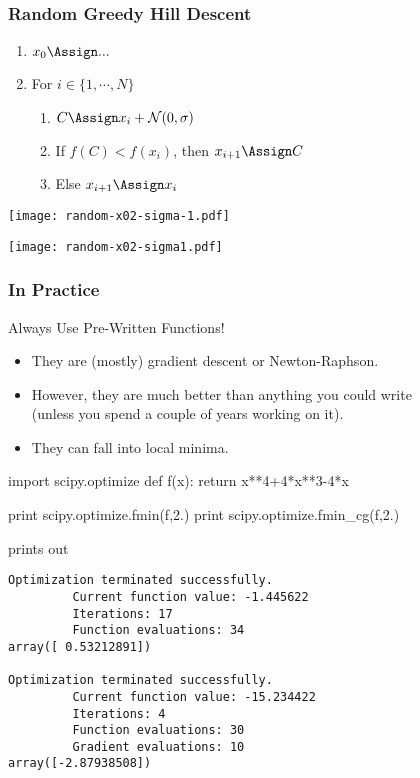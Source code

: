 \begin{frame}[fragile]
\frametitle{Random Greedy Hill Descent}
\begin{enumerate}
\item $x_0 \Assign ...$
\item For $i \in \{ 1, \cdots , N \}$
\begin{enumerate}
\item $C \Assign x_i + \mathcal{N}(0,\sigma)$
\item If $f(C) < f(x_i)$, then $x_{i+1} \Assign C$
\item Else $x_{i+1} \Assign x_i$
\end{enumerate}
\end{enumerate}
\end{frame}

\begin{frame}[fragile]

\centering
\texttt{[image: random-x02-sigma-1.pdf]}

\end{frame}


\begin{frame}[fragile]

\centering
\texttt{[image: random-x02-sigma1.pdf]}

\end{frame}

\begin{frame}[fragile]
\frametitle{In Practice}

\begin{block}{Always Use Pre-Written Functions!}
\begin{itemize}
\item They are (mostly) \alert{gradient descent} or \alert{Newton-Raphson}.
\item However, they are \alert{much better} than anything you could write\\
    (unless you spend a couple of years working on it).
\item They can fall into local minima.
\end{itemize}
\end{block}

\end{frame}

\begin{frame}[fragile]
\begin{python}
import scipy.optimize
def f(x):
    return x**4+4*x**3-4*x

print scipy.optimize.fmin(f,2.)
print scipy.optimize.fmin_cg(f,2.)
\end{python}
prints out
\begin{verbatim}
Optimization terminated successfully.
         Current function value: -1.445622
         Iterations: 17
         Function evaluations: 34
array([ 0.53212891])

Optimization terminated successfully.
         Current function value: -15.234422
         Iterations: 4
         Function evaluations: 30
         Gradient evaluations: 10
array([-2.87938508])
\end{verbatim}
\end{frame}

